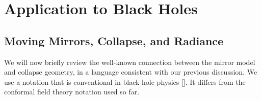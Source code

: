 \chapter{Application to Black Holes}


\def\ad{a^\dagger}
\def\bd{b^\dagger {}}
\def\cd{c^\dagger {}}
\def\ab{{\bf a}}
\def\bb{{\bf b}}
\def\cb{{\bf c}}
\def\abd{{\bf a^\dagger}}
\def\bbd{{\bf b^\dagger}}
\def\cbd{{\bf c^\dagger}}

\def\A{{\bf A}}
\def\Ad{{\bf A^\dagger}}
\def\At{{\bf A^T}}
\def\As{{\bf A^*}}
\def\B{{\bf B}}
\def\Bd{{\bf B^\dagger}}
\def\Bt{{\bf B^T}}
\def\Bs{{\bf B^*}}

\def\o{\omega}
\def\ot{{\tilde \omega}}
\def\eps{\epsilon}
\def\ka{\kappa_0}
\def\sig{\sigma}

\def\Ci{{\cal C}_i}
\def\Cf{{\cal C}_f}
\def\Cfa{{\cal C}_{f1}}
\def\Cfb{{\cal C}_{f2}}
\def\R{{\cal R}}
\def\Ra{{\cal R}_1}
\def\Rb{{\cal R}_2}
\def\Fa{{\cal F}_1}
\def\Fb{{\cal F}_2}

\def\vac{|0 \rangle}

\def\ftn{\tilde f_{0}{}}
\def\gao{g_{1 \o}}
\def\gbo{g_{2 \o}}
\def\gam{| \gao |}
\def\fao{f_{1 \o}}
\def\fbo{f_{2 \o}}

\def\se{S_{exp}}
\def\sa{S_{act}}


\def\dx{\Delta x}
\def\set #1{\{ #1 \} }

\def\prop{\propto}

\def\ad{a^\dagger}
\def\bd{b^\dagger {}}
\def\cd{c^\dagger {}}
\def\clo{c_{L \o}}
\def\cro{c_{R \o}}
\def\cld{\clo^\dagger}
\def\crd{\cro^\dagger}


\overfullrule=0pt

\def\ad{a^\dagger}
\def\bd{b^\dagger {}}
\def\cd{c^\dagger {}}

\def\o{\omega}
\def\ot{{\tilde \omega}}



\def\Gv{G_{vac}(1,2)}



\section{Moving Mirrors, Collapse, and Radiance}

We will now briefly review the well-known connection between
the mirror model and collapse geometry, in a language consistent
with our previous discussion. We use a notation that is conventional
in black hole physics [\birrell]. It differs from the conformal field theory
notation used so far.


